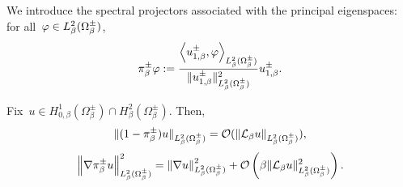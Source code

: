        We introduce the spectral projectors associated with the principal eigenspaces: for all~$\varphi\in L_\beta^2(\Omega_\beta^\pm)$,
        \[\pi^\pm_\beta \varphi := \frac{\left\langle u^\pm_{1,\beta},\varphi \right\rangle_{L_\beta^2(\Omega_\beta^\pm)}}{\|u^\pm_{1,\beta}\|^2_{L_\beta^2(\Omega_\beta^\pm)}}u^\pm_{1,  \beta}.\]
        \begin{lemma}
            \label{02:lemma:resolvent_estimate}
            Fix~$u\in H_{0,\beta}^1(\Omega_\beta^\pm)\cap H^2_\beta(\Omega_\beta^\pm)$. Then,
            \begin{equation}
                \label{02:eq:lemma_resolvent_eqa}
                \|(1-\pi^\pm_{\beta})u\|_{L_\beta^2(\Omega_\beta^\pm)} = \mathcal{O}(\|\mathcal{L}_\beta u\|_{L_\beta^2(\Omega_\beta^\pm)}),
            \end{equation}
            \begin{equation}
                \label{02:eq:lemma_resolvent_eqb}
                \left\|\nabla \pi^\pm_{\beta} u\right\|_{L_\beta^2(\Omega_\beta^\pm)}^2 = \left\|\nabla u\right\|_{ L_\beta^2(\Omega_\beta^\pm)}^2 + \mathcal{O}\left(\beta\|\mathcal{L}_\beta u\|_{L_\beta^2(\Omega_\beta^\pm)}^2\right).
            \end{equation}
        \end{lemma}
